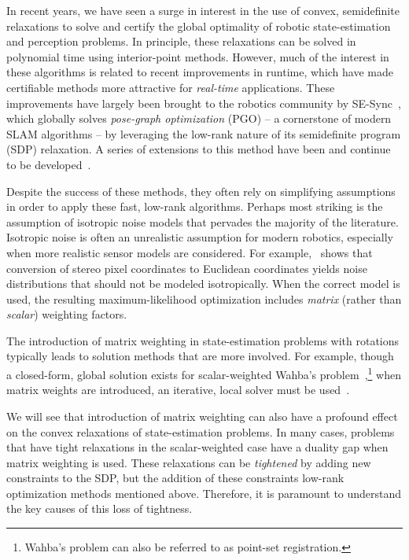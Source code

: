 \documentclass[lettersize,journal]{IEEEtran}
\newcommand{\rev}[1]{\color{red}{#1}\color{black}}
\begin{document}
In recent years, we have seen a surge in interest in the use of convex, semidefinite relaxations to solve and certify the global optimality of robotic state-estimation and perception problems. 
In principle, these relaxations can be solved in polynomial time using interior-point methods\cite{vandenbergheSemidefiniteProgramming1996}. However, much of the interest in these algorithms is related to recent improvements in runtime, which have made certifiable methods more attractive for \emph{real-time} applications. These improvements have largely been brought to the robotics community by SE-Sync~\cite{rosenSESyncCertifiablyCorrect2019}, which globally solves \emph{pose-graph optimization} (PGO) -- a cornerstone of modern SLAM algorithms -- by leveraging the low-rank nature of its semidefinite program (SDP) relaxation. A series of extensions to this method have been and continue to be developed~\cite{rosenAdvancesInferenceRepresentation2021}.

Despite the success of these methods, they often rely on simplifying assumptions in order to apply these fast, low-rank algorithms. Perhaps most striking is the assumption of isotropic noise models that pervades the majority of the literature. Isotropic noise is often an unrealistic assumption for modern robotics, especially when more realistic sensor models are considered. For example,~\cite{matthiesErrorModelingStereo1987} shows that conversion of stereo pixel coordinates to Euclidean coordinates yields noise distributions that should not be modeled isotropically. When the correct model is used, the resulting maximum-likelihood optimization includes \emph{matrix} (rather than \emph{scalar}) weighting factors. 

The introduction of matrix weighting in state-estimation problems with rotations typically leads to solution methods that are more involved. For example, though a closed-form, global solution exists for scalar-weighted Wahba's problem~\cite{hornClosedformSolutionAbsolute1987, hornClosedFormSolutionAbsolute1988, wahbaLeastSquaresEstimate1965},\footnote{Wahba's problem can also be referred to as point-set registration.} when matrix weights are introduced, an iterative, local solver must be used~\cite{chengTotalLeastSquaresEstimate2019, barfootStateEstimationRobotics2017}. %

We will see that introduction of matrix weighting can also have a profound effect on the convex relaxations of state-estimation problems. In many cases, problems that have tight relaxations in the scalar-weighted case have a duality gap when matrix weighting is used. These relaxations can be \emph{tightened} by adding new constraints to the SDP, but the addition of these constraints \rev{may degrade the performance of } low-rank optimization methods mentioned above. Therefore, it is paramount to understand the key causes of this loss of tightness.
\end{document}

